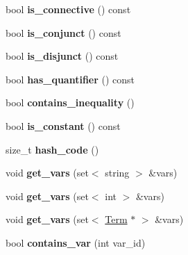 \begin{DoxyCompactItemize}
\item 
\hypertarget{classCNode_a7160054b9009ac754adf939fcede2c06}{bool {\bfseries is\-\_\-connective} () const }\label{classCNode_a7160054b9009ac754adf939fcede2c06}

\item 
\hypertarget{classCNode_a9f8ba18507cf325f16c27aefb2f08144}{bool {\bfseries is\-\_\-conjunct} () const }\label{classCNode_a9f8ba18507cf325f16c27aefb2f08144}

\item 
\hypertarget{classCNode_a844e27e25a8922209ff1692ae6176dc5}{bool {\bfseries is\-\_\-disjunct} () const }\label{classCNode_a844e27e25a8922209ff1692ae6176dc5}

\item 
\hypertarget{classCNode_a9cb25629fb582727223b4f7375229b2a}{bool {\bfseries has\-\_\-quantifier} () const }\label{classCNode_a9cb25629fb582727223b4f7375229b2a}

\item 
\hypertarget{classCNode_aeba7734a7bf98f7dd0c2555854cb7b77}{bool {\bfseries contains\-\_\-inequality} ()}\label{classCNode_aeba7734a7bf98f7dd0c2555854cb7b77}

\item 
\hypertarget{classCNode_ab501fd73558903d8acf3929edf125db1}{bool {\bfseries is\-\_\-constant} () const }\label{classCNode_ab501fd73558903d8acf3929edf125db1}

\item 
\hypertarget{classCNode_a35776e5a7020e14f06e2538f3ddb949b}{size\-\_\-t {\bfseries hash\-\_\-code} ()}\label{classCNode_a35776e5a7020e14f06e2538f3ddb949b}

\item 
\hypertarget{classCNode_acb109c93cc7db248648a32f9edc7004c}{void {\bfseries get\-\_\-vars} (set$<$ string $>$ \&vars)}\label{classCNode_acb109c93cc7db248648a32f9edc7004c}

\item 
\hypertarget{classCNode_a67e5a06823614885686a1b4742eeafec}{void {\bfseries get\-\_\-vars} (set$<$ int $>$ \&vars)}\label{classCNode_a67e5a06823614885686a1b4742eeafec}

\item 
\hypertarget{classCNode_a68ada4c5f7820ef613f2c0e28ec0ac10}{void {\bfseries get\-\_\-vars} (set$<$ \hyperlink{classTerm}{\-Term} $\ast$ $>$ \&vars)}\label{classCNode_a68ada4c5f7820ef613f2c0e28ec0ac10}

\item 
\hypertarget{classCNode_aa0a9793c7cc5d1f91c85e00e1138a4f8}{bool {\bfseries contains\-\_\-var} (int var\-\_\-id)}\label{classCNode_aa0a9793c7cc5d1f91c85e00e1138a4f8}


\end{DoxyCompactItemize}
